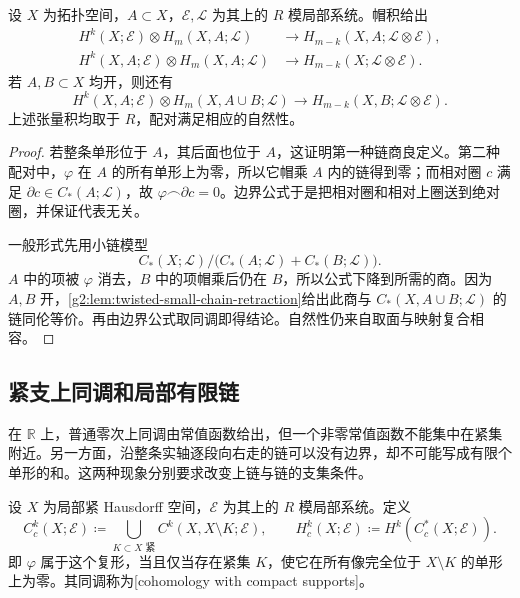 \begin{proposition}\label{g2:prop:relative-cap}
	设 \(X\) 为拓扑空间，\(A\subset X\)，\(\mathcal E,\mathcal L\) 为其上的 \(R\) 模局部系统。帽积给出
	\[
		\begin{aligned}
			H^k(X;\mathcal E)\otimes H_m(X,A;\mathcal L)
			&\longrightarrow H_{m-k}(X,A;\mathcal L\otimes\mathcal E),\\
			H^k(X,A;\mathcal E)\otimes H_m(X,A;\mathcal L)
			&\longrightarrow H_{m-k}(X;\mathcal L\otimes\mathcal E).
		\end{aligned}
	\]
	若 \(A,B\subset X\) 均开，则还有
	\begin{equation}\label{g2:eq:relative-cap-general}
		H^k(X,A;\mathcal E)\otimes H_m(X,A\cup B;\mathcal L)
		\longrightarrow H_{m-k}(X,B;\mathcal L\otimes\mathcal E).
	\end{equation}
	上述张量积均取于 \(R\)，配对满足相应的自然性。
\end{proposition}
\begin{proof}
	若整条单形位于 \(A\)，其后面也位于 \(A\)，这证明第一种链商良定义。第二种配对中，\(\varphi\) 在 \(A\) 的所有单形上为零，所以它帽乘 \(A\) 内的链得到零；而相对圈 \(c\) 满足 \(\partial c\in C_*(A;\mathcal L)\)，故 \(\varphi\frown\partial c=0\)。边界公式于是把相对圈和相对上圈送到绝对圈，并保证代表无关。

	一般形式先用小链模型
	\[
		C_*(X;\mathcal L)\big/\bigl(C_*(A;\mathcal L)+C_*(B;\mathcal L)\bigr).
	\]
	\(A\) 中的项被 \(\varphi\) 消去，\(B\) 中的项帽乘后仍在 \(B\)，所以公式下降到所需的商。因为 \(A,B\) 开，\cref{g2:lem:twisted-small-chain-retraction}给出此商与 \(C_*(X,A\cup B;\mathcal L)\) 的链同伦等价。再由边界公式取同调即得结论。自然性仍来自取面与映射复合相容。
\end{proof}

\subsection{紧支上同调和局部有限链}
\label{g2:subsec:0602:03}
在 \(\mathbb R\) 上，普通零次上同调由常值函数给出，但一个非零常值函数不能集中在紧集附近。另一方面，沿整条实轴逐段向右走的链可以没有边界，却不可能写成有限个单形的和。这两种现象分别要求改变上链与链的支集条件。

\begin{definition}[紧支上同调]\label{g2:def:compact-support-cohomology}
	设 \(X\) 为局部紧 Hausdorff 空间，\(\mathcal E\) 为其上的 \(R\) 模局部系统。定义
	\[
		C_c^k(X;\mathcal E)\coloneqq
		\bigcup_{K\subset X\text{ 紧}}C^k(X,X\setminus K;\mathcal E),
		\qquad H_c^k(X;\mathcal E)\coloneqq H^k(C_c^*(X;\mathcal E)).
	\]
	即 \(\varphi\) 属于这个复形，当且仅当存在紧集 \(K\)，使它在所有像完全位于 \(X\setminus K\) 的单形上为零。其同调称为[cohomology with compact supports]。
\end{definition}

